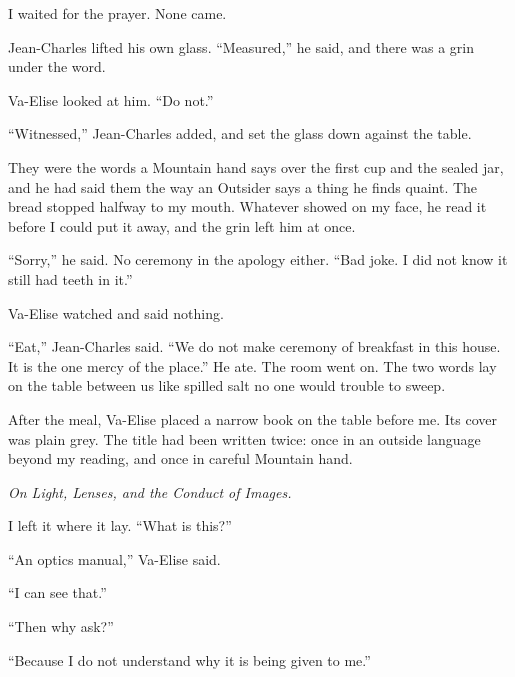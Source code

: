 I waited for the prayer. None came.\par

Jean-Charles lifted his own glass. ``Measured,'' he said, and there was a grin under the word.\par

Va-Elise looked at him. ``Do not.''\par

``Witnessed,'' Jean-Charles added, and set the glass down against the table.\par

They were the words a Mountain hand says over the first cup and the sealed jar, and he had said them the way an Outsider says a thing he finds quaint. The bread stopped halfway to my mouth. Whatever showed on my face, he read it before I could put it away, and the grin left him at once.\par

``Sorry,'' he said. No ceremony in the apology either. ``Bad joke. I did not know it still had teeth in it.''\par

Va-Elise watched and said nothing.\par

``Eat,'' Jean-Charles said. ``We do not make ceremony of breakfast in this house. It is the one mercy of the place.'' He ate. The room went on. The two words lay on the table between us like spilled salt no one would trouble to sweep.\par

After the meal, Va-Elise placed a narrow book on the table before me. Its cover was plain grey. The title had been written twice: once in an outside language beyond my reading, and once in careful Mountain hand.\par

\textit{On Light, Lenses, and the Conduct of Images.}\par

I left it where it lay. ``What is this?''\par

``An optics manual,'' Va-Elise said.\par

``I can see that.''\par

``Then why ask?''\par

``Because I do not understand why it is being given to me.''\par

